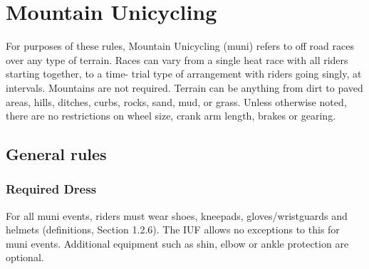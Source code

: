 \chapter{Mountain Unicycling}

For purposes of these rules, Mountain Unicycling (muni) refers to off road races
over any type of terrain. Races can vary from a single heat race with all riders
starting together, to a time- trial type of arrangement with riders going
singly, at intervals. Mountains are not required. Terrain can be anything from
dirt to paved areas, hills, ditches, curbs, rocks, sand, mud, or grass. Unless
otherwise noted, there are no restrictions on wheel size, crank arm length,
brakes or gearing.


\section{General rules}


\subsection{Required Dress}
For all muni events, riders must wear shoes, kneepads, gloves/wristguards and
helmets (definitions, Section 1.2.6). %
The IUF allows no exceptions to this for muni events. Additional equipment such
as shin, elbow or ankle protection are optional.


